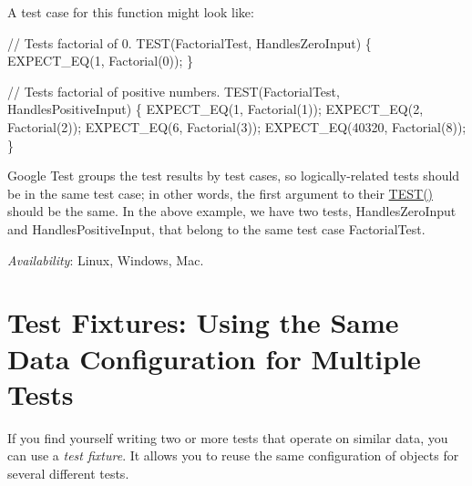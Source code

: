 A test case for this function might look like\+: 
\begin{DoxyCode}
// Tests factorial of 0.
TEST(FactorialTest, HandlesZeroInput) \{
  EXPECT\_EQ(1, Factorial(0));
\}

// Tests factorial of positive numbers.
TEST(FactorialTest, HandlesPositiveInput) \{
  EXPECT\_EQ(1, Factorial(1));
  EXPECT\_EQ(2, Factorial(2));
  EXPECT\_EQ(6, Factorial(3));
  EXPECT\_EQ(40320, Factorial(8));
\}
\end{DoxyCode}


Google Test groups the test results by test cases, so logically-\/related tests should be in the same test case; in other words, the first argument to their {\ttfamily \hyperlink{gtest_8h_ad8b332753515c0ab8baada563c2547eb}{T\+E\+S\+T()}} should be the same. In the above example, we have two tests, {\ttfamily Handles\+Zero\+Input} and {\ttfamily Handles\+Positive\+Input}, that belong to the same test case {\ttfamily Factorial\+Test}.

{\itshape Availability}\+: Linux, Windows, Mac.

\section*{Test Fixtures\+: Using the Same Data Configuration for Multiple Tests}

If you find yourself writing two or more tests that operate on similar data, you can use a {\itshape test fixture}. It allows you to reuse the same configuration of objects for several different tests.

